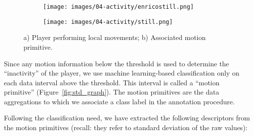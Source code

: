 \begin{figure}[H]
  \centering
  \begin{subfigure}[b]{0.3\textwidth}
  	 \centering
      \texttt{[image: images/04-activity/enricostill.png]}
      \caption{}
  \end{subfigure}
  \begin{subfigure}[b]{0.3\textwidth}
  	 \centering
      \texttt{[image: images/04-activity/still.png]}
      \caption{}
  \end{subfigure}
  \caption{a) Player performing local movements; b) Associated motion primitive.}    
  \label{fig:localmov}
\end{figure}
    
Since any motion information below the threshold is used to determine the ``inactivity'' of the player, we use machine learning-based classification only on each data interval above the threshold. This interval is called a ``motion primitive'' (Figure~\ref{fig:std_graph}). The motion primitives are the data aggregations to which we associate a class label in the annotation procedure. 

Following the classification need, we have extracted the following descriptors from the motion primitives (recall: they refer to standard deviation of the raw values): 


